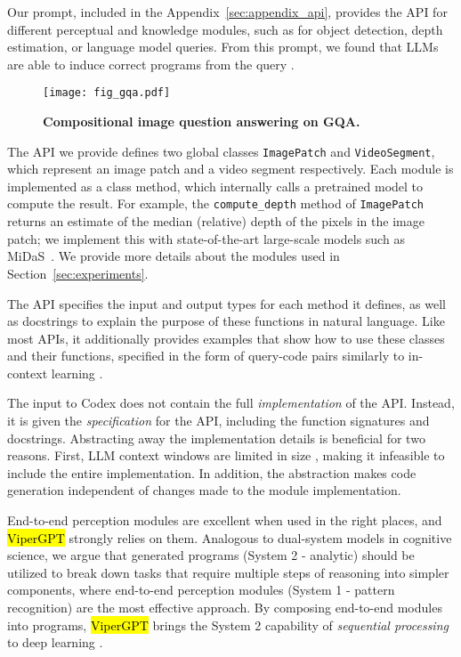 \documentclass[10pt,twocolumn,letterpaper]{article}
\newcommand{\viper}[0]{{\small\fontfamily{txtt}\selectfont \textcolor{mygreen}{\hl{ViperGPT}}}\xspace}
\begin{document}
Our prompt, included in the Appendix~\ref{sec:appendix_api}, provides the API for different perceptual and knowledge modules, such as for object detection, depth estimation, or language model queries. From this prompt, we found that LLMs are able to induce correct programs  from the query .

\begin{figure*}[t]
    \texttt{[image: fig\_gqa.pdf]}
    \caption{\textbf{Compositional image question answering on GQA.}}
    \label{fig:gqa}
\end{figure*}


The API we provide defines two global classes \texttt{ImagePatch} and \texttt{VideoSegment}, which represent an image patch and a video segment respectively. Each module is implemented as a class method, which internally calls a pretrained model to compute the result. For example, the \texttt{compute\_depth} method of \texttt{ImagePatch} returns an estimate of the median (relative) depth of the pixels in the image patch; we implement this with state-of-the-art large-scale models such as MiDaS~\cite{Ranftl2022}. We provide more details about the modules used in Section~\ref{sec:experiments}. 


The API specifies the input and output types for each method it defines, as well as docstrings to explain the purpose of these functions in natural language. Like most APIs, it additionally provides examples that show how to use these classes and their functions, specified in the form of query-code pairs similarly to in-context learning \cite{suris2020learning,brown_language_2020}. 

The input to Codex does not contain the full \textit{implementation} of the API. Instead, it is given the \textit{specification} for the API, including the function signatures and docstrings. Abstracting away the implementation details is beneficial for two reasons. First, LLM context windows are limited in size \cite{brown_language_2020}, making it infeasible to include the entire implementation. In addition, the abstraction makes code generation independent of changes made to the module implementation.

End-to-end perception modules are excellent when used in the right places, and \viper strongly relies on them. Analogous to dual-system models \cite{kahneman2011thinking} in cognitive science, we argue that generated programs (System 2 - analytic) should be utilized to break down tasks that require multiple steps of reasoning into simpler components, where end-to-end perception modules (System 1 - pattern recognition) are the most effective approach. By composing end-to-end modules into programs, \viper brings the System 2 capability of \textit{sequential processing} to deep learning \cite{bengio_consciousness_2019}.
\end{document}
